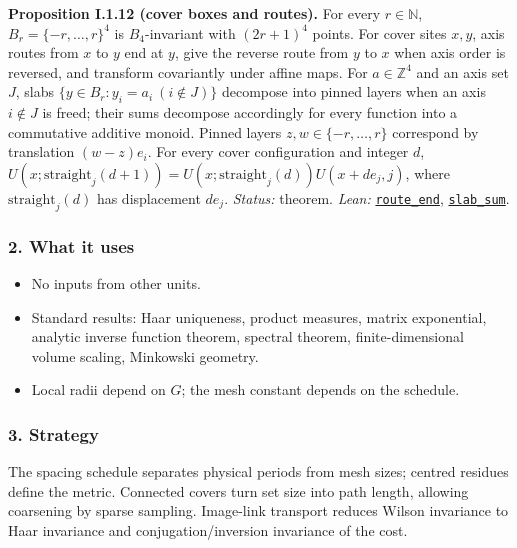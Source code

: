\documentclass[
  letterpaper,
  11pt]{article}
\providecommand{\tightlist}{%
  \setlength{\itemsep}{0pt}\setlength{\parskip}{0pt}}
\begin{document}
\textbf{Proposition I.1.12 (cover boxes and routes).} For every
\(r\in\mathbb N\), \(B_r=\{-r,\ldots,r\}^4\) is \(B_4\)-invariant with
\((2r+1)^4\) points. For cover sites \(x,y\), axis routes from \(x\) to
\(y\) end at \(y\), give the reverse route from \(y\) to \(x\) when axis
order is reversed, and transform covariantly under affine maps. For
\(a\in\mathbb Z^4\) and an axis set \(J\), slabs
\(\{y\in B_r:y_i=a_i\ (i\notin J)\}\) decompose into pinned layers when
an axis \(i\notin J\) is freed; their sums decompose accordingly for
every function into a commutative additive monoid. Pinned layers
\(z,w\in\{-r,\ldots,r\}\) correspond by translation \((w-z)e_i\). For
every cover configuration and integer \(d\),
\(U(x;\mathrm{straight}_j(d+1))=U(x;\mathrm{straight}_j(d))U(x+de_j,j)\),
where \(\mathrm{straight}_j(d)\) has displacement \(de_j\).
\emph{Status:} theorem. \emph{Lean:}
\href{https://github.com/yang-mills-group/OpenAI-YM-20261028/blob/3456e5e75cf8d4cd558955a5c7638fba2d68f464/YM/Lattice/Box.lean\#L74-L80}{\texttt{route\_end}},
\href{https://github.com/yang-mills-group/OpenAI-YM-20261028/blob/3456e5e75cf8d4cd558955a5c7638fba2d68f464/YM/Lattice/Foliation.lean\#L62-L71}{\texttt{slab\_sum}}.

\subsubsection{2. What it uses}\label{what-it-uses}

\begin{itemize}
\tightlist
\item
  No inputs from other units.
\item
  Standard results: Haar uniqueness, product measures, matrix
  exponential, analytic inverse function theorem, spectral theorem,
  finite-dimensional volume scaling, Minkowski geometry.
\item
  Local radii depend on \(G\); the mesh constant depends on the
  schedule.
\end{itemize}

\subsubsection{3. Strategy}\label{strategy}

The spacing schedule separates physical periods from mesh sizes; centred
residues define the metric. Connected covers turn set size into path
length, allowing coarsening by sparse sampling. Image-link transport
reduces Wilson invariance to Haar invariance and conjugation/inversion
invariance of the cost.
\end{document}
